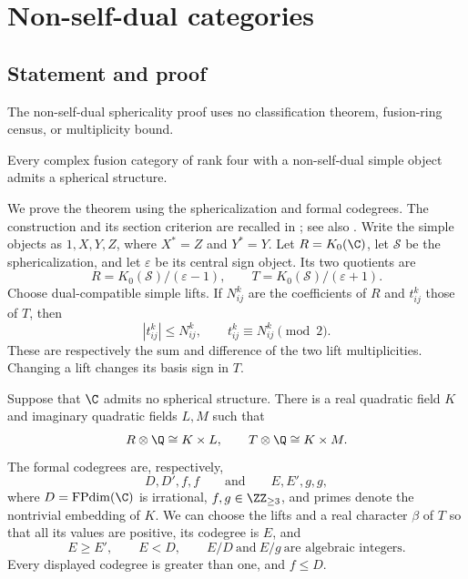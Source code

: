 \section{Non-self-dual categories}\label{sec:ns}

\subsection{Statement and proof}

The non-self-dual sphericality proof uses no classification theorem,
fusion-ring census, or multiplicity bound.


\begin{theorem}\label{ns:thm:ns-spherical}
Every complex fusion category of rank four with a non-self-dual simple
object admits a spherical structure.
\end{theorem}

We prove the theorem using the sphericalization and formal codegrees.
The construction and its section criterion are recalled in
\cite[Section~5.1]{Ostrik3}; see also \cite[Section~5.3]{Bartlett}.
Write the simple objects as $1,X,Y,Z$, where $X^*=Z$ and $Y^*=Y$.
Let $R=K_0(\C)$, let $\mathcal S$ be the sphericalization, and
let $\varepsilon$ be its central sign object. Its two quotients are
\[
 R=K_0(\mathcal S)/(\varepsilon-1),\qquad
 T=K_0(\mathcal S)/(\varepsilon+1).
\]
Choose dual-compatible simple lifts. If $N_{ij}^k$ are the coefficients
of $R$ and $t_{ij}^k$ those of $T$, then
\begin{equation}\label{ns:eq:ns-domination}
 |t_{ij}^k|\leq N_{ij}^k,\qquad t_{ij}^k\equiv N_{ij}^k\pmod2.
\end{equation}
These are respectively the sum and difference of the two lift
multiplicities. Changing a lift changes its basis sign in $T$.

\begin{lemma}\label{ns:lem:ns-fields}
Suppose that $\C$ admits no spherical structure. There is a real quadratic
field $K$ and imaginary quadratic fields $L,M$ such that
\[
 R\otimes\Q\cong K\times L,\qquad
 T\otimes\Q\cong K\times M.
\]
The formal codegrees are, respectively,
\[
 D,D',f,f\qquad\text{and}\qquad E,E',g,g,
\]
where $D=\operatorname{FPdim}(\C)$ is irrational,
$f,g\in\ZZ_{\geq3}$, and primes denote the nontrivial embedding
of $K$. We can choose the lifts and a real character $\beta$ of $T$
so that all its values are positive, its codegree is $E$, and
\begin{equation}\label{ns:eq:ns-basic}
 E\geq E',\qquad E<D,\qquad
 E/D\ \text{and}\ E/g\ \text{are algebraic integers}.
\end{equation}
Every displayed codegree is greater than one, and $f\leq D$.
\end{lemma}

